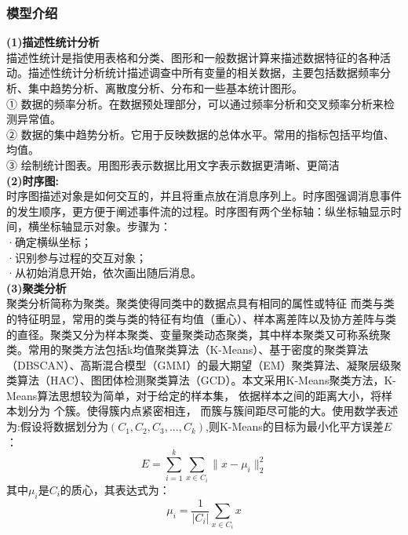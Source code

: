 \documentclass[UTF8]{article}
\begin{document}
     \subsubsection{模型介绍}
     \textbf{(1)描述性统计分析}\\
        描述性统计是指使用表格和分类、图形和一般数据计算来描述数据特征的各种活动。描述性统计分析统计描述调查中所有变量的相关数据，主要包括数据频率分析、集中趋势分析、离散度分析、分布和一些基本统计图形。\\
        ① 数据的频率分析。在数据预处理部分，可以通过频率分析和交叉频率分析来检测异常值。\\
        ② 数据的集中趋势分析。它用于反映数据的总体水平。常用的指标包括平均值、均值。\\
        ③ 绘制统计图表。用图形表示数据比用文字表示数据更清晰、更简洁\\
    \textbf{(2)时序图:}\\
         时序图描述对象是如何交互的，并且将重点放在消息序列上。时序图强调消息事件的发生顺序，更方便于阐述事件流的过程。时序图有两个坐标轴：纵坐标轴显示时间，横坐标轴显示对象。步骤为：\\
        ·确定横纵坐标；\\
        ·识别参与过程的交互对象；\\
        ·从初始消息开始，依次画出随后消息。\\
    \textbf{(3)聚类分析}\\
        聚类分析简称为聚类。聚类使得同类中的数据点具有相同的属性或特征
        而类与类的特征明显，常用的类与类的特征有均值（重心）、样本离差阵以及协方差阵与类的直径。聚类又分为样本聚类、变量聚类动态聚类，其中样本聚类又可称系统聚类。常用的聚类方法包括k均值聚类算法（K-Means）、基于密度的聚类算法（DBSCAN）、高斯混合模型（GMM）的最大期望（EM）聚类算法、凝聚层级聚类算法（HAC）、图团体检测聚类算法（GCD）。本文采用K-Means聚类方法，K-Means算法思想较为简单，对于给定的样本集，
        依据样本之间的距离大小，将样本划分为 个簇。使得簇内点紧密相连，
        而簇与簇间距尽可能的大。使用数学表述为:假设将数据划分为$( C_1,C_2,C_3,...,C_k) $,则K-Means的目标为最小化平方误差$E$：
                \begin{equation}
                    E=\sum_{i=1}^k\sum_{x \in C_i}\| x-\mu_i \|_2^2  
                \end{equation}
        其中$\mu_i$是$C_i$的质心，其表达式为：
                \begin{equation}
                    \mu_i = \frac{1}{|C_i|}\sum_{x \in C_i}x 
                \end{equation}
\end{document}
